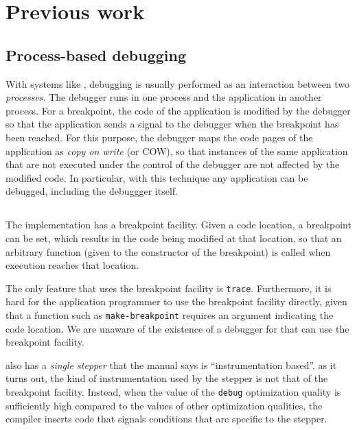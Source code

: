 \section{Previous work}

\subsection{Process-based debugging}

With systems like \unix{}, debugging is usually performed as an
interaction between two \emph{processes}.  The debugger runs in one
process and the application in another process.  For a breakpoint, the
code of the application is modified by the debugger so that the
application sends a signal to the debugger when the breakpoint has
been reached.  For this purpose, the debugger maps the code pages of
the application as \emph{copy on write} (or COW), so that instances of
the same application that are not executed under the control of the
debugger are not affected by the modified code.  In particular, with
this technique any application can be debugged, including the
debuggger itself.

\subsection{\sbcl{}}

The \sbcl{} \commonlisp{} implementation has a breakpoint facility.
Given a code location, a breakpoint can be set, which results in the
code being modified at that location, so that an arbitrary function
(given to the constructor of the breakpoint) is called when execution
reaches that location.

The only feature that uses the breakpoint facility is \texttt{trace}.
Furthermore, it is hard for the application programmer to use the
breakpoint facility directly, given that a function such as
\texttt{make-breakpoint} requires an argument indicating the code
location.  We are unaware of the existence of a debugger for \sbcl{}
that can use the breakpoint facility.

\sbcl{} also has a \emph{single stepper} that the manual says is
``instrumentation based''.  as it turns out, the kind of
instrumentation used by the stepper is not that of the breakpoint
facility.  Instead, when the value of the \texttt{debug} optimization
quality is sufficiently high compared to the values of other
optimization qualities, the compiler inserts code that signals
conditions that are specific to the stepper.

